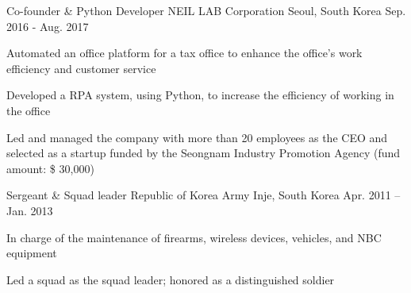 


\begin{cventries}


\cventry
{Co-founder \& Python Developer} %
{NEIL LAB Corporation} %
{Seoul, South Korea} %
{Sep. 2016 - Aug. 2017} %
{ %
\begin{cvitems}
\item {Automated an office platform for a tax office to enhance the office’s work efficiency and customer service}
\item {Developed a RPA system, using Python, to increase the efficiency of working in the office}
\item {Led and managed the company with more than 20 employees as the CEO and selected as a startup funded by the Seongnam Industry Promotion Agency (fund amount: \$ 30,000)}
\end{cvitems}
}


\cventry
{Sergeant \& Squad leader} %
{Republic of Korea Army} %
{Inje, South Korea} %
{Apr. 2011 – Jan. 2013} %
{ %
\begin{cvitems}
\item {In charge of the maintenance of firearms, wireless devices, vehicles, and NBC equipment}
\item {Led a squad as the squad leader; honored as a distinguished soldier}
\end{cvitems}
}



\end{cventries}